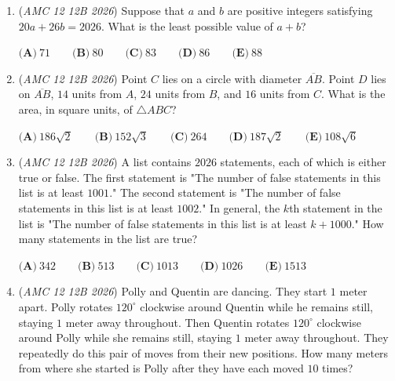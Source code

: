 \begin{enumerate}
 $\textbf{(A)}\   \frac{1}{4}  \qquad                 \textbf{(B)}\   \frac{1}{2}  \qquad                 \textbf{(C)}\   \frac{1}{2}\sqrt{2}  \qquad                 \textbf{(D)}\   \frac{3}{4}  \qquad                 \textbf{(E)}\   \sqrt{2}$


	\item (\textit{AMC 12 12B 2026}) Suppose that $a$ and $b$ are positive integers satisfying $20a + 26b = 2026$. What is the least possible value of $a+b$?


 $\textbf{(A)}\   71  \qquad                 \textbf{(B)}\   80  \qquad                 \textbf{(C)}\   83  \qquad                 \textbf{(D)}\   86  \qquad                 \textbf{(E)}\   88$


	\item (\textit{AMC 12 12B 2026}) Point $C$ lies on a circle with diameter $\overline{AB}$. Point $D$ lies on $\overline{AB}$, $14$ units from $A$, $24$ units from $B$, and $16$ units from $C$. What is the area, in square units, of $\triangle ABC$?


 $\textbf{(A)}\   186\sqrt{2}  \qquad                 \textbf{(B)}\   152\sqrt{3}  \qquad                 \textbf{(C)}\   264  \qquad                 \textbf{(D)}\   187\sqrt{2}  \qquad                 \textbf{(E)}\   108\sqrt{6}$


	\item (\textit{AMC 12 12B 2026}) A list contains $2026$ statements, each of which is either true or false. The first statement is "The number of false statements in this list is at least $1001$." The second statement is "The number of false statements in this list is at least $1002$." In general, the $k$th statement in the list is "The number of false statements in this list is at least $k+1000$." How many statements in the list are true?


 $\textbf{(A)}\   342  \qquad                 \textbf{(B)}\   513  \qquad                 \textbf{(C)}\   1013  \qquad                 \textbf{(D)}\   1026  \qquad                 \textbf{(E)}\   1513$


	\item (\textit{AMC 12 12B 2026}) Polly and Quentin are dancing. They start $1$ meter apart. Polly rotates $120^{\circ}$ clockwise around Quentin while he remains still, staying $1$ meter away throughout. Then Quentin rotates $120^{\circ}$ clockwise around Polly while she remains still, staying $1$ meter away throughout. They repeatedly do this pair of moves from their new positions. How many meters from where she started is Polly after they have each moved $10$ times?



\end{enumerate}
